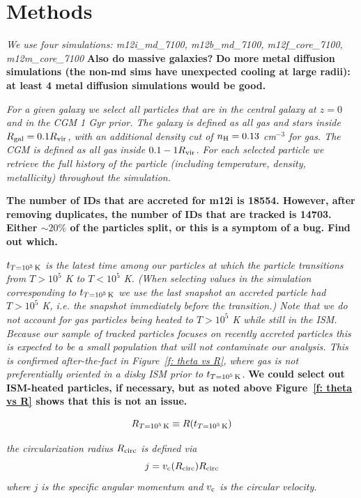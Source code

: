 \documentclass[fleqn,usenatbib]{mnras}
\newcommand{\Rcool}{R_{T=10^5\,{\rm K}}}
\newcommand{\tcon}{t_{T=10^5\,{\rm K}}}
\newcommand{\Rcirc}{R_{\rm circ}} %
\begin{document}
\section{Methods}

\textit{
We use four simulations:
m12i\_md\_7100, m12b\_md\_7100, m12f\_core\_7100, m12m\_core\_7100
}
\textbf{Also do massive galaxies?}
\textbf{Do more metal diffusion simulations (the non-md sims have unexpected cooling at large radii): at least 4 metal diffusion simulations would be good.}

\textit{
For a given galaxy we select all particles that are in the central galaxy at $z=0$ and in the CGM 1 Gyr prior.
The galaxy is defined as all gas and stars inside $R_{\rm gal} = 0.1 R_{\rm vir}$, with an additional density cut of $n_{\rm H} = 0.13$ cm$^{-3}$ for gas.
The CGM is defined as all gas inside $0.1 -1 R_{\rm vir}$.
For each selected particle we retrieve the full history of the particle (including temperature, density, metallicity) throughout the simulation.
}

\textbf{The number of IDs that are accreted for m12i is 18554.
However, after removing duplicates, the number of IDs that are tracked is 14703.
Either $\sim20\%$ of the particles split, or this is a symptom of a bug.
Find out which.}

\textit{
$\tcon$ is the latest time among our particles at which the particle transitions from $T > 10^5$ K to $T< 10^5$ K.
(When selecting values in the simulation corresponding to $\tcon$ we use the last snapshot an accreted particle had $T > 10^5$ K, i.e. the snapshot immediately before the transition.)
Note that we do not account for gas particles being heated to $T > 10^5$ K while still in the ISM.
Because our sample of tracked particles focuses on recently accreted particles this is expected to be a small population that will not contaminate our analysis.
This is confirmed after-the-fact in Figure~\ref{f: theta vs R}, where gas is not preferentially oriented in a disky ISM prior to $\tcon$.
}
\textbf{We could select out ISM-heated particles, if necessary, but as noted above Figure~\ref{f: theta vs R} shows that this is not an issue.}

\begin{equation}
    \Rcool \equiv R(t_{T=10^5\,{\rm K}})
\end{equation}


\textit{the circularization radius $\Rcirc$ is defined via}
\begin{equation}
    j = v_{\rm c}(\Rcirc)\Rcirc
\end{equation}
\textit{where $j$ is the specific angular momentum and $v_{\rm c}$ is the circular velocity.}
\end{document}
